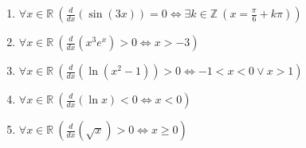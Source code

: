 \documentclass[11pt,a4paper]{article}
\begin{document}
\begin{enumerate}
\item $\displaystyle \forall x \in \mathbb{R}\ \left(\frac{d}{dx}\left( \sin(3x) \right) = 0 \iff \exists k \in \mathbb{Z}\ \left(x = \frac{\pi}{6} + k\pi\right)\right)$
\item $\displaystyle \forall x \in \mathbb{R}\ \left(\frac{d}{dx}\left( x^{3}e^{x} \right) > 0 \iff x > -3\right)$
\item $\displaystyle \forall x \in \mathbb{R}\ \left(\frac{d}{dx}\left( \ln(x^{2} - 1) \right) > 0 \iff -1 < x < 0 \lor x > 1\right)$
\item $\displaystyle \forall x \in \mathbb{R}\ \left(\frac{d}{dx}\left( \ln x \right) < 0 \iff x < 0\right)$
\item $\displaystyle \forall x \in \mathbb{R}\ \left(\frac{d}{dx}\left( \sqrt{x} \right) > 0 \iff x \ge 0\right)$
\end{enumerate}
\end{document}
